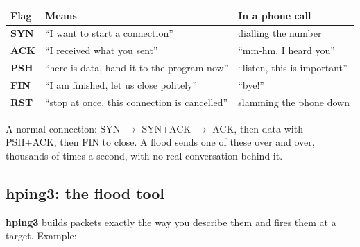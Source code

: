 \documentclass[11pt,a4paper]{article}
\begin{document}
\begin{center}
\begin{tabularx}{\linewidth}{P{2.0cm}P{4.4cm}L}
\toprule
Flag & Means & In a phone call \\
\midrule
\textbf{SYN} & ``I want to start a connection'' & dialling the number \\
\textbf{ACK} & ``I received what you sent'' & ``mm-hm, I heard you'' \\
\textbf{PSH} & ``here is data, hand it to the program now'' & ``listen, this is important'' \\
\textbf{FIN} & ``I am finished, let us close politely'' & ``bye!'' \\
\textbf{RST} & ``stop at once, this connection is cancelled'' & slamming the phone down \\
\bottomrule
\end{tabularx}
\end{center}

A normal connection: SYN $\rightarrow$ SYN+ACK $\rightarrow$ ACK, then data with PSH+ACK, then FIN to close. A flood
sends one of these over and over, thousands of times a second, with no real conversation behind it.

\subsection{hping3: the flood tool}

\textbf{hping3} builds packets exactly the way you describe them and fires them at a target. Example:
\end{document}
